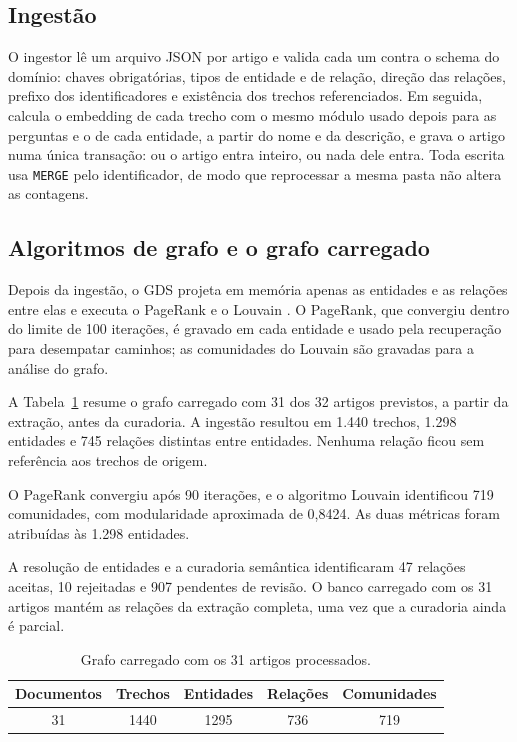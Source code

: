 \documentclass[12pt]{article}
\begin{document}
\subsection{Ingestão}

O ingestor lê um arquivo JSON por artigo e valida cada um contra o schema do domínio:
chaves obrigatórias, tipos de entidade e de relação, direção das relações, prefixo dos
identificadores e existência dos trechos referenciados. Em seguida, calcula o embedding de
cada trecho com o mesmo módulo usado depois para as perguntas e o de cada entidade, a
partir do nome e da descrição, e grava o artigo numa
única transação: ou o artigo entra inteiro, ou nada dele entra. Toda escrita usa
\texttt{MERGE} pelo identificador, de modo que reprocessar a mesma pasta não altera as
contagens.

\subsection{Algoritmos de grafo e o grafo carregado}
\label{sec:grafo-carregado}

Depois da ingestão, o GDS projeta em memória apenas as entidades e as relações entre elas
e executa o PageRank \cite{page1999pagerank} e o Louvain \cite{blondel2008louvain}. O
PageRank, que convergiu dentro do limite de 100 iterações, é gravado em cada entidade e usado pela
recuperação para desempatar caminhos; as comunidades do Louvain são gravadas para a
análise do grafo.

A Tabela~\ref{tab:grafo} resume o grafo carregado com 31 dos
32 artigos previstos, a partir da extração, antes da curadoria.
A ingestão resultou em 1.440 trechos, 1.298 entidades e 745
relações distintas entre entidades. Nenhuma relação ficou sem
referência aos trechos de origem.

O PageRank convergiu após 90 iterações, e o algoritmo Louvain
identificou 719 comunidades, com modularidade aproximada de
0,8424. As duas métricas foram atribuídas às 1.298 entidades.

A resolução de entidades e a curadoria semântica identificaram
47 relações aceitas, 10 rejeitadas e 907 pendentes de revisão.
O banco carregado com os 31 artigos mantém as relações da
extração completa, uma vez que a curadoria ainda é parcial.

\begin{table}[ht]
\centering
\caption{Grafo carregado com os 31 artigos processados.}
\label{tab:grafo}
\small
\begin{tabular}{ccccc}
\toprule
\textbf{Documentos} & \textbf{Trechos} & \textbf{Entidades} & \textbf{Relações} & \textbf{Comunidades} \\
\midrule
31 & 1440 & 1295 & 736 & 719 \\
\bottomrule
\end{tabular}
\end{table}
\end{document}
